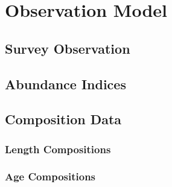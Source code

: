 \documentclass[11pt,
  english,
  letterpaper,
]{article}
\begin{document}
\leavevmode\tagmcend\tagstructend


\hypertarget{observation-model}{%
\section{Observation Model}\label{observation-model}}

\leavevmode\tagmcend\tagstructend


\hypertarget{survey-observation}{%
\subsection{Survey Observation}\label{survey-observation}}

\leavevmode\tagmcend\tagstructend


\hypertarget{abundance-indices}{%
\subsection{Abundance Indices}\label{abundance-indices}}

\leavevmode\tagmcend\tagstructend


\hypertarget{composition-data}{%
\subsection{Composition Data}\label{composition-data}}

\leavevmode\tagmcend\tagstructend


\hypertarget{length-compositions}{%
\subsubsection{Length Compositions}\label{length-compositions}}

\leavevmode\tagmcend\tagstructend


\hypertarget{age-compositions}{%
\subsubsection{Age Compositions}\label{age-compositions}}
\end{document}

